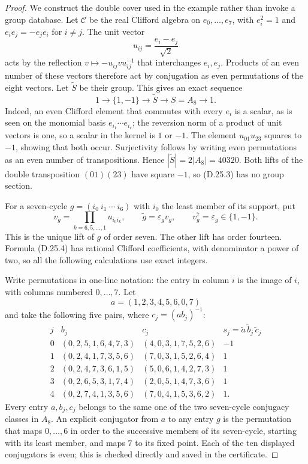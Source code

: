 \begin{proof}
We construct the double cover used in the example rather than
invoke a group database.  Let $\mathcal C$ be the real Clifford
algebra on $e_0,\ldots,e_7$, with $e_i^2=1$ and
$e_ie_j=-e_je_i$ for $i\ne j$.  The unit vector
\[
 u_{ij}=\frac{e_i-e_j}{\sqrt2}
 \tag{D.25.2}
\]
acts by the reflection $v\mapsto-u_{ij}vu_{ij}^{-1}$ that
interchanges $e_i,e_j$.  Products of an even number of these
vectors therefore act by conjugation as even permutations of
the eight vectors.  Let $\widetilde S$ be their group.  This
gives an exact sequence
\[
 1\longrightarrow\{1,-1\}\longrightarrow\widetilde S
 \longrightarrow S=A_8\longrightarrow1.
 \tag{D.25.3}
\]
Indeed, an even Clifford element that commutes with every $e_i$
is a scalar, as is seen on the monomial basis $e_{i_1}\cdots
e_{i_r}$; the reversion norm of a product of unit vectors is
one, so a scalar in the kernel is $1$ or $-1$.  The element
$u_{01}u_{23}$ squares to $-1$, showing that both occur.
Surjectivity follows by writing even permutations as an even
number of transpositions.  Hence $|\widetilde S|=2|A_8|=40320$.
Both lifts of the double transposition $(01)(23)$ have square
$-1$, so \textup{(D.25.3)} has no group section.

For a seven-cycle $g=(i_0\ i_1\ \cdots\ i_6)$ with $i_0$
the least member of its support, put
\[
 v_g=\prod_{k=6,5,\ldots,1}u_{i_0i_k},\qquad
 \widetilde g=\varepsilon_gv_g,\qquad
 v_g^7=\varepsilon_g\in\{1,-1\}.
 \tag{D.25.4}
\]
This is the unique lift of $g$ of order seven.  The other lift
has order fourteen.  Formula \textup{(D.25.4)} has rational
Clifford coefficients, with denominator a power of two, so all
the following calculations use exact integers.

Write permutations in one-line notation: the entry in column
$i$ is the image of $i$, with columns numbered $0,\ldots,7$.
Let
\[
 a=(1,2,3,4,5,6,0,7)
\]
and take the following five pairs, where $c_j=(ab_j)^{-1}$:
\[
\begin{array}{c|c|c|r}
 j&b_j&c_j&
  s_j=\widetilde a\,\widetilde b_j\,\widetilde c_j\\\hline
 0&(0,2,5,1,6,4,7,3)&(4,0,3,1,7,5,2,6)&-1\\
 1&(0,2,4,1,7,3,5,6)&(7,0,3,1,5,2,6,4)&1\\
 2&(0,2,4,7,3,6,1,5)&(5,0,6,1,4,2,7,3)&1\\
 3&(0,2,6,5,3,1,7,4)&(2,0,5,1,4,7,3,6)&1\\
 4&(0,2,7,4,1,3,5,6)&(7,0,4,1,5,3,6,2)&1.
\end{array}
 \tag{D.25.5}
\]
Every entry $a,b_j,c_j$ belongs to the same one of the two
seven-cycle conjugacy classes in $A_8$.  An explicit conjugator
from $a$ to any entry $g$ is the permutation that maps
$0,\ldots,6$ in order to the successive members of its
seven-cycle, starting with its least member, and maps $7$ to
its fixed point.  Each of the ten displayed conjugators is
even; this is checked directly and saved in the certificate.


\end{proof}
